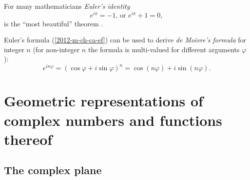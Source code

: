 For many mathematicians
{\em Euler's identity}
\begin{equation}
e^{i\pi}=-1 \textrm{, or } e^{i\pi}+1=0,
\end{equation}
is the ``most beautiful'' theorem \cite{springerlink:10.1007/BF03023741}.

Euler's formula (\ref{2012-m-ch-ca-ef}) can be used to derive {\em de Moivre's formula}
 for integer $n$ (for non-integer $n$ the formula is multi-valued for different arguments $\varphi$):
\begin{equation}
e^{in\varphi} = (\cos \varphi +i \sin \varphi )^n      = \cos (n\varphi) +i \sin (n\varphi).
\end{equation}






\section{Geometric representations of complex numbers and functions thereof}

\subsection{The complex plane}

